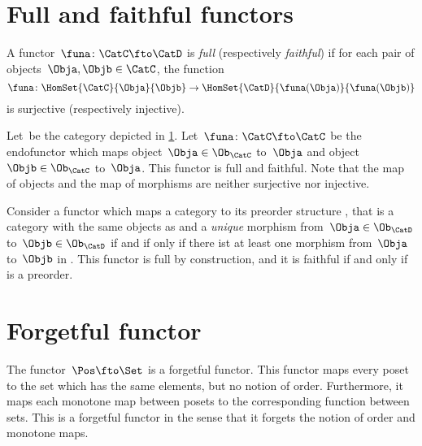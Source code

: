 

\section{Full and faithful functors}
\begin{ctdefinition}
  \label{def:functorfullfaith}
  A functor~$\funa\colon \CatC \fto \CatD$ is \emph{full} (respectively \emph{faithful}) if for each pair of objects~$\Obja,\Objb\in \CatC$, the function
  \begin{equation}
    \funa \colon \HomSet{\CatC}{\Obja}{\Objb} \to \HomSet{\CatD}{\funa(\Obja)}{\funa(\Objb)}
  \end{equation}
  is surjective (respectively injective).
\end{ctdefinition}

\begin{example}
  Let~\CatC be the category depicted in \cref{fig:ex_full_faithful_1}. Let~$\funa\colon \CatC \fto \CatC$ be the endofunctor which maps object~$\Obja\in \Ob_{\CatC}$ to~$\Obja$ and object~$\Objb\in \Ob_{\CatC}$ to~$\Obja$. This functor is full and faithful. Note that the map of objects and the map of morphisms are neither surjective nor injective.

  \begin{figure}[h!]
    \centering
    \caption{\label{fig:ex_full_faithful_1}}
  \end{figure}
\end{example}

\begin{example}
  Consider a functor which maps a category \CatC to its preorder structure \CatD, that is a category with the same objects as \CatC and a \emph{unique} morphism from~$\Obja\in \Ob_\CatD$ to~$\Objb\in \Ob_\CatD$ if and if only if there ist at least one morphism from~$\Obja$ to~$\Objb$ in \CatC. This functor is full by construction, and it is faithful if and only if \CatC is a preorder.
\end{example}


\section{Forgetful functor}

\begin{example}
  The functor~$\Pos \fto \Set$ is a forgetful functor. This functor maps every poset to the set which has the same elements, but no notion of order. Furthermore, it maps each monotone map between posets to the corresponding function between sets. This is a forgetful functor in the sense that it forgets the notion of order and monotone maps.
\end{example}

